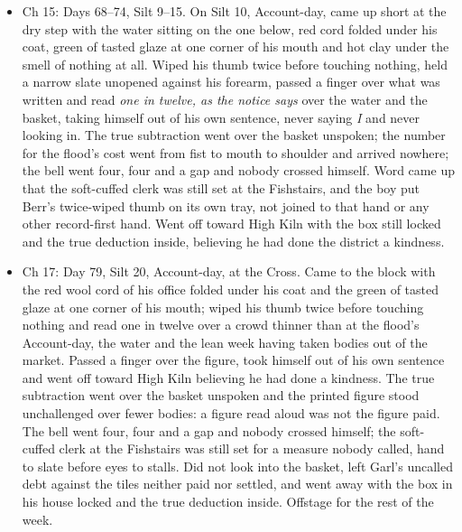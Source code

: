 \documentclass{design/chronicle}
\begin{document}
{\begin{itemize}[leftmargin=1.4em,itemsep=1pt,topsep=3pt,parsep=0pt]
\end{itemize}

\begin{itemize}[leftmargin=1.4em,itemsep=1pt,topsep=3pt,parsep=0pt]

\item Ch 15: Days 68–74, Silt 9–15. On Silt 10, Account-day, came up short at the dry step with the water sitting on the one below, red cord folded under his coat, green of tasted glaze at one corner of his mouth and hot clay under the smell of nothing at all. Wiped his thumb twice before touching nothing, held a narrow slate unopened against his forearm, passed a finger over what was written and read \emph{one in twelve, as the notice says} over the water and the basket, taking himself out of his own sentence, never saying \emph{I} and never looking in. The true subtraction went over the basket unspoken; the number for the flood’s cost went from fist to mouth to shoulder and arrived nowhere; the bell went four, four and a gap and nobody crossed himself. Word came up that the soft-cuffed clerk was still set at the Fishstairs, and the boy put Berr’s twice-wiped thumb on its own tray, not joined to that hand or any other record-first hand. Went off toward High Kiln with the box still locked and the true deduction inside, believing he had done the district a kindness.

\end{itemize}

\begin{itemize}[leftmargin=1.4em,itemsep=1pt,topsep=3pt,parsep=0pt]

\item Ch 17: Day 79, Silt 20, Account-day, at the Cross. Came to the block with the red wool cord of his office folded under his coat and the green of tasted glaze at one corner of his mouth; wiped his thumb twice before touching nothing and read one in twelve over a crowd thinner than at the flood’s Account-day, the water and the lean week having taken bodies out of the market. Passed a finger over the figure, took himself out of his own sentence and went off toward High Kiln believing he had done a kindness. The true subtraction went over the basket unspoken and the printed figure stood unchallenged over fewer bodies: a figure read aloud was not the figure paid. The bell went four, four and a gap and nobody crossed himself; the soft-cuffed clerk at the Fishstairs was still set for a measure nobody called, hand to slate before eyes to stalls. Did not look into the basket, left Garl’s uncalled debt against the tiles neither paid nor settled, and went away with the box in his house locked and the true deduction inside. Offstage for the rest of the week.


\end{itemize}}
\end{document}
